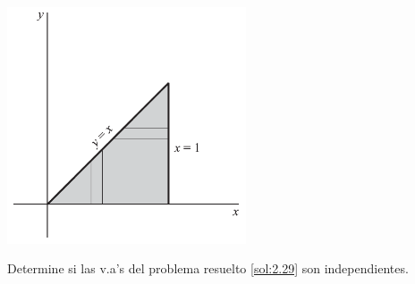  \begin{center}
 \includegraphics[height=7cm,keepaspectratio=true]{./pe/pands0217.png}
\end{center}



 \begin{ejemplo}
  \label{sol:2.30}
  Determine si las v.a's del problema resuelto \ref{sol:2.29} son independientes.
 \end{ejemplo}


